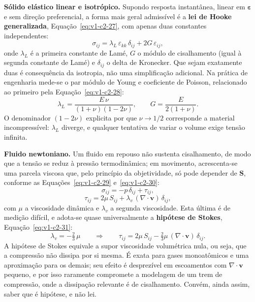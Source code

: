 \documentclass[12pt,a4paper]{article}
\numberwithin{equation}{section}
\numberwithin{table}{section}
\numberwithin{figure}{section}
\begin{document}
\textbf{Sólido elástico linear e isotrópico.} Supondo resposta instantânea,
linear em $\boldsymbol{\varepsilon}$ e sem direção preferencial, a forma mais
geral admissível é a \textbf{lei de Hooke generalizada},
Equação~\eqref{eq:v1-c2-27}, com apenas duas constantes independentes:
\begin{equation}\label{eq:v1-c2-27}
\sigma_{ij} = \lambda_L \, \varepsilon_{kk} \, \delta_{ij} +
2G \, \varepsilon_{ij},
\end{equation}
onde $\lambda_L$ é a primeira constante de Lamé, $G$ o módulo de cisalhamento
(igual à segunda constante de Lamé) e $\delta_{ij}$ o delta de Kronecker. Que
sejam exatamente duas é consequência da isotropia, não uma simplificação
adicional. Na prática de engenharia mede-se o par módulo de Young e coeficiente
de Poisson, relacionado ao primeiro pela Equação~\eqref{eq:v1-c2-28}:
\begin{equation}\label{eq:v1-c2-28}
\lambda_L = \frac{E\,\nu}{(1+\nu)(1-2\nu)},
\qquad
G = \frac{E}{2(1+\nu)} .
\end{equation}
O denominador $(1-2\nu)$ explicita por que $\nu \to 1/2$ corresponde a material
incompressível: $\lambda_L$ diverge, e qualquer tentativa de variar o volume
exige tensão infinita.

\textbf{Fluido newtoniano.} Um fluido em repouso não sustenta cisalhamento, de
modo que a tensão se reduz à pressão termodinâmica; em movimento, acrescenta-se
uma parcela viscosa que, pelo princípio da objetividade, só pode depender de
$\mathbf{S}$, conforme as Equações~\eqref{eq:v1-c2-29} e~\eqref{eq:v1-c2-30}:
\begin{equation}\label{eq:v1-c2-29}
\sigma_{ij} = -p\,\delta_{ij} + \tau_{ij},
\end{equation}
\begin{equation}\label{eq:v1-c2-30}
\tau_{ij} = 2\mu\,S_{ij} + \lambda_v \,(\nabla\cdot\mathbf{v})\,\delta_{ij},
\end{equation}
com $\mu$ a viscosidade dinâmica e $\lambda_v$ a segunda viscosidade. Esta
última é de medição difícil, e adota-se quase universalmente a \textbf{hipótese
de Stokes}, Equação~\eqref{eq:v1-c2-31}:
\begin{equation}\label{eq:v1-c2-31}
\lambda_v = -\tfrac{2}{3}\,\mu
\qquad\Longrightarrow\qquad
\tau_{ij} = 2\mu\,S_{ij} - \tfrac{2}{3}\mu\,(\nabla\cdot\mathbf{v})\,\delta_{ij}.
\end{equation}
A hipótese de Stokes equivale a supor viscosidade volumétrica nula, ou seja,
que a compressão não dissipa por si mesma. É exata para gases monoatômicos e
uma aproximação para os demais; seu efeito é desprezível em escoamentos com
$\nabla\cdot\mathbf{v}$ pequeno, e por isso raramente compromete a modelagem de
um trem de compressão, onde a dissipação relevante é de cisalhamento. Convém,
ainda assim, saber que é hipótese, e não lei.
\end{document}
